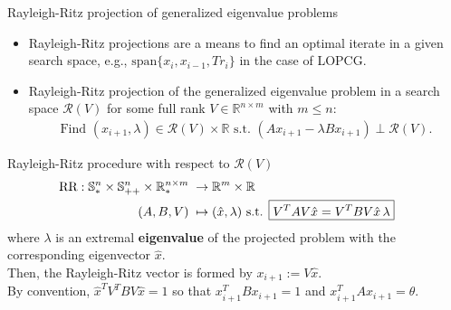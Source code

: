 \documentclass[t,usepdftitle=false]{beamer}
\begin{document}
\begin{frame}{Rayleigh-Ritz projection of generalized eigenvalue problems}
\begin{itemize}
\item Rayleigh-Ritz projections are a means to find an optimal iterate in a given search space, e.g., $\mathrm{span}\{x_i,x_{i-1},Tr_i\}$ in the case of LOPCG.
\item Rayleigh-Ritz projection of the generalized eigenvalue problem in a search space $\mathcal{R}(V)$ for some full rank $V\in\mathbb{R}^{n\times m}$ with $m\leq n$:
	\begin{align*}
	\text{Find }
	(x_{i+1},\lambda)\in\mathcal{R}(V)\times \mathbb{R}
	\text{ s.t. }
	(Ax_{i+1}-\lambda Bx_{i+1})\perp\mathcal{R}(V).
	\end{align*}
	\end{itemize}
	\vspace{-.25cm}
	\begin{block}{Rayleigh-Ritz procedure with respect to $\mathcal{R}(V)$}
		\vspace{-.3cm}
		\begin{align*}
			\hspace{-.5cm}
			\text{RR}:
			\mathbb{S}_*^{n}\times\mathbb{S}_{++}^{n}\times\mathbb{R}_*^{n\times m}&\;\rightarrow\mathbb{R}^{m}\times\mathbb{R}\\
			(A,B,V)&\;\mapsto (\hat{x},\lambda)
			\text{ s.t. }
			\boxed{V^TAV\hat{x}=V^TBV\hat{x}\,\lambda }
		\end{align*}
		where $\lambda$ is an extremal \textbf{eigenvalue}	
		of the projected problem with the corresponding eigenvector $\hat{x}.$\\
		\smallskip
		Then, the Rayleigh-Ritz vector is formed by $x_{i+1}:=V\hat{x}$.\\
		\smallskip
		By convention, $\hat{x}^TV^TBV\hat{x}=1$ so that $x_{i+1}^TBx_{i+1}=1$ and $x_{i+1}^TAx_{i+1}=\theta$.
	\end{block}
\end{frame}		
	
\end{document}
